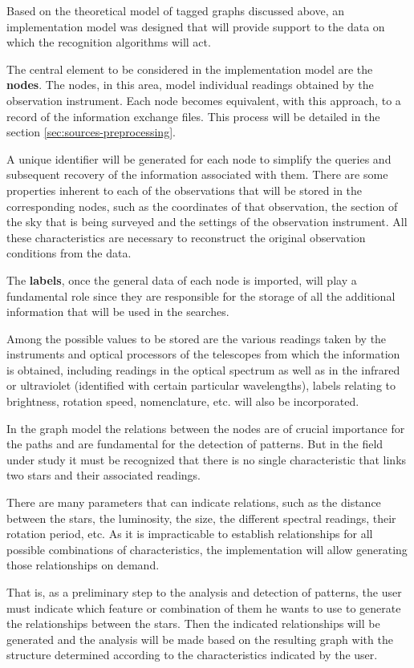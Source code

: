 	Based on the theoretical model of tagged graphs discussed above, an implementation model was designed that will provide support to the data on which the recognition algorithms will act.

	The central element to be considered in the implementation model are the \textbf{nodes}. The nodes, in this area, model individual readings obtained by the observation instrument. Each node becomes equivalent, with this approach, to a record of the information exchange files. This process will be detailed in the section \ref{sec:sources-preprocessing}.
	
	A unique identifier will be generated for each node to simplify the queries and subsequent recovery of the information associated with them. There are some properties inherent to each of the observations that will be stored in the corresponding nodes, such as the coordinates of that observation, the section of the sky that is being surveyed and the settings of the observation instrument. All these characteristics are necessary to reconstruct the original observation conditions from the data.
	
	The \textbf {labels}, once the general data of each node is imported, will play a fundamental role since they are responsible for the storage of all the additional information that will be used in the searches.
	
	Among the possible values to be stored are the various readings taken by the instruments and optical processors of the telescopes from which the information is obtained, including readings in the optical spectrum as well as in the infrared or ultraviolet (identified with certain particular wavelengths), labels relating to brightness, rotation speed, nomenclature, etc. will also be incorporated.
	
	In the graph model the relations between the nodes are of crucial importance for the paths and are fundamental for the detection of patterns. But in the field under study it must be recognized that there is no single characteristic that links two stars and their associated readings.
	
	There are many parameters that can indicate relations, such as the distance between the stars, the luminosity, the size, the different spectral readings, their rotation period, etc. As it is impracticable to establish relationships for all possible combinations of characteristics, the implementation will allow generating those relationships on demand.
	
	That is, as a preliminary step to the analysis and detection of patterns, the user must indicate which feature or combination of them he wants to use to generate the relationships between the stars. Then the indicated relationships will be generated and the analysis will be made based on the resulting graph with the structure determined according to the characteristics indicated by the user.
	
